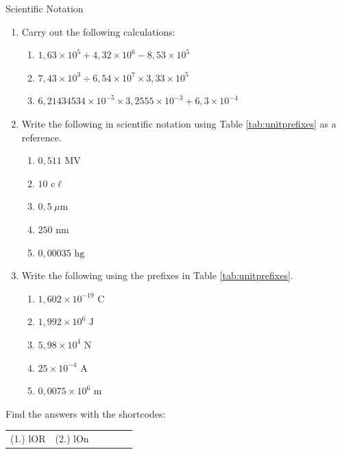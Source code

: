 \begin{exercises}{Scientific Notation }
            \nopagebreak \noindent
\begin{enumerate}[noitemsep, label=\textbf{\arabic*}. ] 
 \item Carry out the following calculations:
    \begin{enumerate}[noitemsep, label=\textbf{\alph*}. ] 
     \item $1,63 \times 10^{5} + 4,32 \times 10^{6} - 8,53 \times 10^{5}$
     \item $7,43 \times 10^{3} \div 6,54 \times 10^{7} \times 3,33 \times 10^{5}$
     \item $6,21434534 \times 10^{-5} \times 3,2555 \times 10^{-3} + 6,3 \times 10^{-4}$
    \end{enumerate}
  \item Write the following in scientific notation using Table \ref{tab:unitprefixes} as a reference.
    \begin{enumerate}[noitemsep, label=\textbf{\alph*}. ] 
      \item $0,511 \text{ MV}$
      \item $10 \text{ c}\ell $
      \item $0,5 ~\mu\text{m}$
      \item $250 \text{ nm}$
      \item $0,00035 \text{ hg}$
    \end{enumerate}
  \item Write the following using the prefixes in Table \ref{tab:unitprefixes}.
    \begin{enumerate}[noitemsep, label=\textbf{\alph*}. ] 
      \item $1,602 \times{10}^{-19} \text{ C}$
      \item $1,992 \times{10}^{6} \text { J}$
      \item $5,98 \times{10}^{4} \text{ N}$
      \item $25 \times{10}^{-4} \text{ A}$
      \item $0,0075 \times{10}^{6} \text{ m}$
    \end{enumerate}
\end{enumerate}
\par {} Find the answers with the shortcodes:
 \par \begin{tabular}[h]{cccccc}
 (1.) lOR  &  (2.) lOn  & \end{tabular}
\end{exercises}
